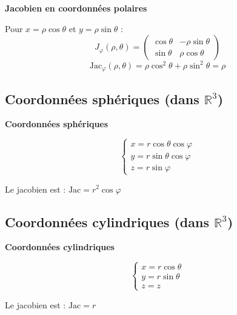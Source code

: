 \documentclass[../PolyS2.tex]{subfiles}
\begin{document}
\begin{Prop}\textbf{Jacobien en coordonnées polaires}

Pour $x = \rho \cos\theta$ et $y = \rho \sin\theta$ :
$$J_\varphi(\rho,\theta) = \begin{pmatrix} \cos\theta & -\rho\sin\theta \\ \sin\theta & \rho\cos\theta \end{pmatrix}$$
$$\text{Jac}_\varphi(\rho,\theta) = \rho\cos^2\theta + \rho\sin^2\theta = \rho$$
\end{Prop}

\newpage 

\subsection{Coordonnées sphériques (dans $\mathbb{R}^3$)}

\begin{Prop}\textbf{Coordonnées sphériques}

$$\begin{cases} x = r\cos\theta\cos\varphi \\ y = r\sin\theta\cos\varphi \\ z = r\sin\varphi \end{cases}$$

Le jacobien est : $\text{Jac} = r^2 \cos\varphi$
\end{Prop}

\subsection{Coordonnées cylindriques (dans $\mathbb{R}^3$)}

\begin{Prop}\textbf{Coordonnées cylindriques}

$$\begin{cases} x = r\cos\theta \\ y = r\sin\theta \\ z = z \end{cases}$$

Le jacobien est : $\text{Jac} = r$
\end{Prop}
\end{document}
